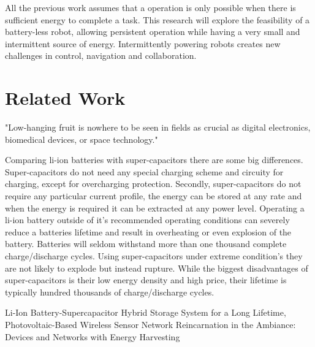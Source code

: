 \documentclass[letterpaper, 10 pt, conference]{ieeeconf}  %
\begin{document}
% 

All the previous work assumes that a operation is only possible when there is sufficient energy to complete a task. 
This research will explore the feasibility of a battery-less robot, allowing persistent operation while having a very small and intermittent source of energy.
Intermittently powering robots creates new challenges in control, navigation and collaboration.

\section{Related Work}

"Low-hanging fruit is nowhere to be seen in fields as crucial as digital electronics, biomedical devices, or space technology."
\cite{zachary_spec_2016}


Comparing li-ion batteries with super-capacitors there are some big differences.
Super-capacitors do not need any special charging scheme and circuity for charging, except for overcharging protection.
Secondly, super-capacitors do not require any particular current profile, the energy can be stored at any rate and when the energy is required it can be extracted at any power level.
Operating a li-ion battery outside of it's recommended operating conditions can severely reduce a batteries lifetime and result in overheating or even explosion of the battery.
Batteries will seldom withstand more than one thousand complete charge/discharge cycles.
Using super-capacitors under extreme condition's they are not likely to explode but instead rupture.
While the biggest disadvantages of super-capacitors is their low energy density and high price, their lifetime is typically hundred thousands of charge/discharge cycles.

Li-Ion Battery-Supercapacitor Hybrid Storage System for a Long Lifetime, Photovoltaic-Based Wireless Sensor Network	\cite{ongaro_pwre_2012}
Reincarnation in the Ambiance: Devices and Networks with Energy Harvesting \cite{prasad_comst_2014}




\end{document}
